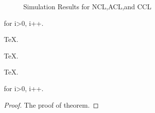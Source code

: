\begin{figure}[H]
\centering
{}
\hspace{0cm}
\caption{Simulation Results for NCL,ACL,and CCL}
\label{figb} %
\end{figure}


\begin{Theorem} 
for i>0, i++.
\end{Theorem}

\begin{Lemma} 
\TeX .
\end{Lemma}

\begin{Lemma} 
\TeX .
\end{Lemma}

\begin{Lemma} 
\TeX .
\end{Lemma}

\begin{Theorem} 
for i>0, i++.
\end{Theorem}

\begin{proof}
The proof of theorem.
\end{proof}



